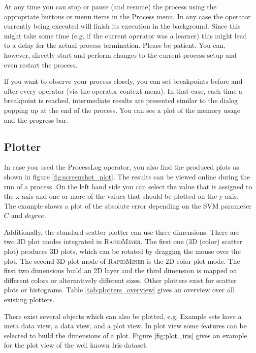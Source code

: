 \documentclass[11pt]{article}
\newcommand{\useroption}[1]{\textsf{#1}}
\newcommand{\operator}[1]{\textsf{#1}}
\newcommand{\rapidminer}{\protect \textsc{RapidMiner}\xspace}
\begin{document}
At any time you can stop or pause (and resume) the process using
the appropriate buttons or menu items in the \useroption{Process}
menu. In any case the operator currently being executed will finish
its execution in the background. Since this might take some time (e.g. if the current
operator was a learner) this might lead to a delay for the actual process
termination. Please be patient. You can, however, directly start and perform changes to
the current process setup and even restart the process.

If you want to observe your process closely, you can set
breakpoints before and after every operator (via the operator context
menu). In that case, each time a breakpoint is reached, intermediate
results are presented similar to the dialog popping up at the end of
the process.
You can see a plot of the memory usage and the progress bar.




\subsection{Plotter}

In case you used the \operator{ProcessLog} operator, you
also find the produced plots as shown in figure
\ref{fig:screenshot_plot}. The results can be viewed online during the
run of a process. On the left hand side you can select the
value that is assigned to the x-axis and one or more of the values
that should be plotted on the y-axis. The example shows a plot of the
absolute error depending on the SVM parameter $C$ and $degree$. 

Additionally, the standard scatter plotter can use three dimensions. There are two 3D
plot modes integrated in \rapidminer. The first one (3D (color) scatter plot)
produces 3D plots, which can be rotated by dragging the 
mouse over the plot. The second 3D plot mode of \rapidminer is the 2D
color plot mode. The first two dimensions build an 2D layer and the
third dimension is mapped on different colors or alternatively different
sizes. Other plotters exist
for scatter plots or histograms. Table \ref{tab:plotters_overview} gives an
overview over all existing plotters.

There exist several objects which can also be plotted, e.g. Example sets
have a meta data view, a data view, and a plot view. In plot view some
features can be selected to build the dimensions of a plot. Figure
\ref{fig:plot_iris} gives an example for the plot view of the well
known Iris dataset.
\end{document}
